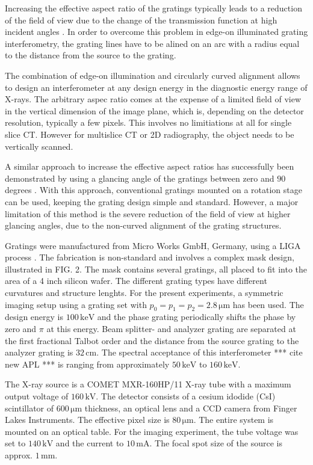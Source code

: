 \documentclass[aps,prl,floatfix,twocolumn,10pt]{revtex4-1}  %
\newcommand{\unit}[1]{\ensuremath{\, \mathrm{#1}}}
\begin{document}
Increasing the effective aspect ratio of the gratings typically leads to a reduction of the field of view due to the change of the transmission function at high incident angles \cite{Thuering2011}. In order to overcome this problem in edge-on illuminated grating interferometry, the grating lines have to be alined on an arc with a radius equal to the distance from the source to the grating.

The combination of edge-on illumination and circularly curved alignment allows to design an interferometer at any design energy in the diagnostic energy range of X-rays. The arbitrary aspec ratio comes at the expense of a limited field of view in the vertical dimension of the image plane, which is, depending on the detector resolution, typically a few pixels. This involves no limitiations at all for single slice CT. However for multislice CT or 2D radiography, the object needs to be vertically scanned.

A similar approach to increase the effective aspect ratios has successfully been demonstrated by using a glancing angle of the gratings between zero and $90$ degrees \cite{Stutman2012}. With this approach, conventional gratings mounted on a rotation stage can be used, keeping the grating design simple and standard. However, a major limitation of this method is the severe reduction of the field of view at higher glancing angles, due to the non-curved alignment of the grating structures.

Gratings were manufactured from Micro Works GmbH, Germany, using a LIGA process \cite{Kenntner2010}. The fabrication is non-standard and involves a complex mask design, illustrated in FIG. 2. The mask contains several gratings, all placed to fit into the area of a 4 inch silicon wafer. The different grating types have different curvatures and structure lenghts. For the present experiments, a symmetric imaging setup using a grating set with $p_0 = p_1 = p_2 = 2.8 \unit{\mu m}$ has been used. The design energy is $100 \unit{keV}$ and the phase grating periodically shifts the phase by zero and $\pi$ at this energy. Beam splitter- and analyzer grating are separated at the first fractional Talbot order and the distance from the source grating to the analyzer grating is $32 \unit{cm}$. The spectral acceptance of this interferometer *** cite new APL *** is ranging from approximately $50 \unit{keV}$ to $160 \unit{keV}$.

The X-ray source is a COMET MXR-160HP/11 X-ray tube with a maximum output voltage of $160 \unit{kV}$. The detector consists of a cesium idodide (CsI) scintillator of $600 \unit{\mu m}$ thickness, an optical lens and a CCD camera from Finger Lakes Instruments. The effective pixel size is $80 \unit{\mu m}$. The entire system is mounted on an optical table. For the imaging experiment, the tube voltage was set to $140 \unit{kV}$ and the current to $10 \unit{mA}$. The focal spot size of the source is approx. $1 \unit{mm}$. 
\end{document}
